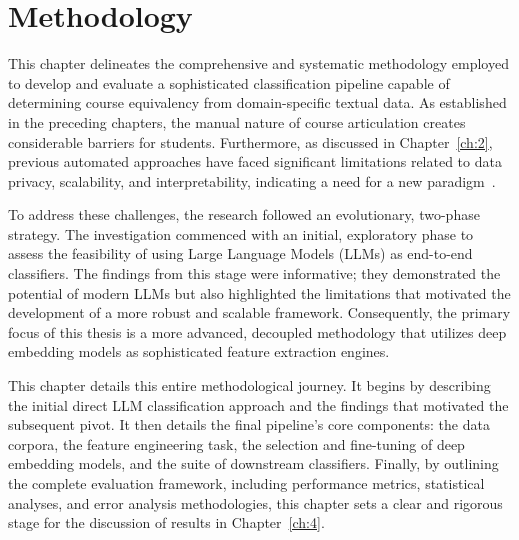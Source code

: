 \chapter{Methodology}\label{ch:3}
This chapter delineates the comprehensive and systematic methodology employed to develop and evaluate a sophisticated classification pipeline capable of determining course equivalency from domain-specific textual data. As established in the preceding chapters, the manual nature of course articulation creates considerable barriers for students. Furthermore, as discussed in Chapter~\ref{ch:2}, previous automated approaches have faced significant limitations related to data privacy, scalability, and interpretability, indicating a need for a new paradigm~\cite{pardos10.1145/3330430.3333622, slade10.1177/0002764213479366}.

To address these challenges, the research followed an evolutionary, two-phase strategy. The investigation commenced with an initial, exploratory phase to assess the feasibility of using Large Language Models (LLMs) as end-to-end classifiers. The findings from this stage were informative; they demonstrated the potential of modern LLMs but also highlighted the limitations that motivated the development of a more robust and scalable framework. Consequently, the primary focus of this thesis is a more advanced, decoupled methodology that utilizes deep embedding models as sophisticated feature extraction engines.

This chapter details this entire methodological journey. It begins by describing the initial direct LLM classification approach and the findings that motivated the subsequent pivot. It then details the final pipeline's core components: the data corpora, the feature engineering task, the selection and fine-tuning of deep embedding models, and the suite of downstream classifiers. Finally, by outlining the complete evaluation framework, including performance metrics, statistical analyses, and error analysis methodologies, this chapter sets a clear and rigorous stage for the discussion of results in Chapter~\ref{ch:4}.

